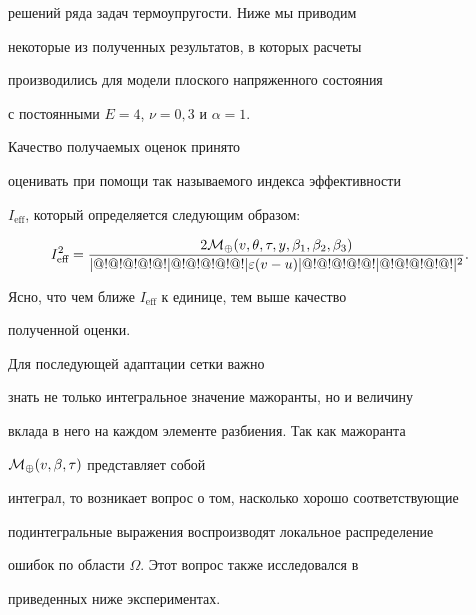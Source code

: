 решений ряда задач термоупругости. Ниже мы приводим


некоторые из полученных результатов, в которых расчеты


производились для модели плоского напряженного состояния


с постоянными $E=4$, $\nu=0{,}3$ и $\alpha=1$.





Качество получаемых оценок принято


оценивать при помощи так называемого индекса эффективности


$I_{\text{eff}}$, который определяется следующим образом:


$$


I_{\text{eff}}^2=\frac{2 {\cal M}_\oplus(v,\theta,\tau,y,\beta_1,\beta_2,


\beta_3)}{\norme{\varepsilon(v-u)}^2}.


$$


Ясно, что чем ближе $I_{\text{eff}}$ к единице, тем выше качество


полученной оценки.








Для последующей адаптации сетки важно


знать не только интегральное значение мажоранты, но и величину


вклада в него на каждом элементе разбиения. Так как мажоранта


${\cal M}_\oplus (v,\beta,\tau)$ представляет собой


интеграл, то возникает вопрос о том, насколько хорошо соответствующие


подинтегральные выражения воспроизводят локальное распределение


ошибок по области $\Omega$. Этот вопрос также исследовался в


приведенных ниже экспериментах.








